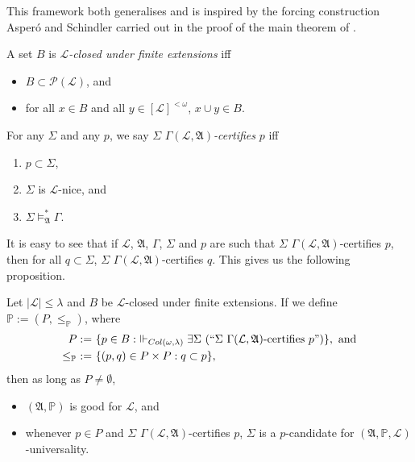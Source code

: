 \documentclass[12pt]{article}
\numberwithin{equation}{section}
\begin{document}
This framework both generalises and is inspired by the forcing construction Asper\'{o} and Schindler carried out in the proof of the main theorem of \cite{schindler}.

\begin{defi}
A set $B$ is $\mathcal{L}$\emph{-closed under finite extensions} iff
\begin{itemize}
    \item $B \subset \mathcal{P}(\mathcal{L})$, and
    \item for all $x \in B$ and all $y \in [\mathcal{L}]^{< \omega}$, $x \cup y \in B$.
\end{itemize}
\end{defi}

\begin{defi}
For any $\Sigma$ and any $p$, we say $\Sigma$ $\Gamma(\mathcal{L}, \mathfrak{A})$\emph{-certifies} $p$ iff 
\begin{enumerate}
    \item $p \subset \Sigma$,
    \item $\Sigma$ is $\mathcal{L}$-nice, and
    \item $\Sigma \models^*_{\mathfrak{A}} \Gamma$.
\end{enumerate}
\end{defi}

It is easy to see that if $\mathcal{L}$, $\mathfrak{A}$, $\Gamma$, $\Sigma$ and $p$ are such that $\Sigma$ $\Gamma(\mathcal{L}, \mathfrak{A})$-certifies $p$, then for all $q \subset \Sigma$, $\Sigma$ $\Gamma(\mathcal{L}, \mathfrak{A})$-certifies $q$. This gives us the following proposition.

\begin{prop}\label{certgood}
Let $|\mathcal{L}| \leq \lambda$ and $B$ be $\mathcal{L}$-closed under finite extensions. If we define $\mathbb{P} := (P, \leq_{\mathbb{P}})$, where
\begin{align*}
    P := \ & \{p \in B : \ \Vdash_{Col(\omega, \lambda)} \exists \Sigma \ (``\Sigma \ \Gamma(\mathcal{L}, \mathfrak{A}) \text{-certifies } p")\}, \text{ and} \\
    \leq_{\mathbb{P}} \ := \ & \{(p, q) \in P \times P : q \subset p\},
\end{align*}
then as long as $P \neq \emptyset$, 
\begin{itemize}
    \item $(\mathfrak{A}, \mathbb{P})$ is good for $\mathcal{L}$, and
    \item whenever $p \in P$ and $\Sigma$ $\Gamma(\mathcal{L}, \mathfrak{A})$-certifies $p$, $\Sigma$ is a $p$-candidate for $(\mathfrak{A}, \mathbb{P}, \mathcal{L})$-universality.
\end{itemize}
\end{prop}
\end{document}
